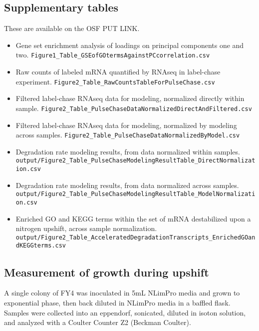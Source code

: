 {\subsection{Supplementary tables}
These are available on the OSF PUT LINK.
\begin{itemize}
  \setlength\itemsep{1em}
  \item Gene set enrichment analysis of loadings on principal 
    components one and two.
    \texttt{Figure1\_Table\_GSEofGOtermsAgainstPCcorrelation.csv}
    \label{microarrayPCAgsea}
  \item Raw counts of labeled mRNA quantified by RNAseq in 
    label-chase experiment.
    \texttt{Figure2\_Table\_RawCountsTableForPulseChase.csv}
    \label{itm:dme211raw}
  \item Filtered label-chase RNAseq data for modeling, normalized 
    directly within sample.
    \texttt{Figure2\_Table\_PulseChaseDataNormalizedDirectAndFiltered.csv}
    \label{itm:dme211filterDirect}
  \item Filtered label-chase RNAseq data for modeling, normalized by
    modeling across samples.
    \texttt{Figure2\_Table\_PulseChaseDataNormalizedByModel.csv}
    \label{itm:dme211filterModel}
  \item Degradation rate modeling results, from data normalized 
    within samples.
    \texttt{output/Figure2\_Table\_PulseChaseModelingResultTable\_DirectNormalization.csv}
    \label{itm:dme211resultsDirect}
  \item Degradation rate modeling results, from data normalized 
    across samples.
    \texttt{output/Figure2\_Table\_PulseChaseModelingResultTable\_ModelNormalization.csv}
    \label{itm:dme211resultsModel}
  \item Enriched GO and KEGG terms within the set of mRNA 
    destabilized upon a nitrogen upshift, across sample normalization.
    \texttt{output/Figure2\_Table\_AcceleratedDegradationTranscripts\_EnrichedGOandKEGGterms.csv}
    \label{itm:dme211goAndKegg}
\end{itemize}

\subsection{Measurement of growth during upshift}

A single colony of FY4 was inoculated in 5mL NLimPro 
media and grown to exponential phase, then back diluted in NLimPro media
in a baffled flask. 
Samples were collected into an eppendorf, sonicated,
diluted in isoton solution, and analyzed with a Coulter Counter Z2
(Beckman Coulter).

}
